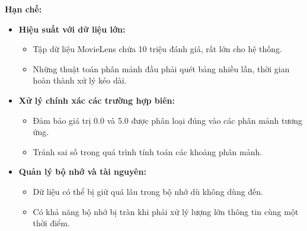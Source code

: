 \documentclass[14pt]{extarticle}
\begin{document}
\textbf{Hạn chế:}
\begin{itemize}
    \item \textbf{Hiệu suất với dữ liệu lớn:}
    \begin{itemize}
        \item Tập dữ liệu MovieLens chứa 10 triệu đánh giá, rất lớn cho hệ thống.
        \item Những thuật toán phân mảnh đầu phải quét bảng nhiều lần, thời gian hoàn thành xử lý kéo dài.
    \end{itemize}
    \item \textbf{Xử lý chính xác các trường hợp biên:}
    \begin{itemize}
        \item Đảm bảo giá trị 0.0 và 5.0 được phân loại đúng vào các phân mảnh tương ứng.
        \item Tránh sai số trong quá trình tính toán các khoảng phân mảnh.
    \end{itemize}
    \item \textbf{Quản lý bộ nhớ và tài nguyên:}
    \begin{itemize}
        \item Dữ liệu có thể bị giữ quá lâu trong bộ nhớ dù không dùng đến.
        \item Có khả năng bộ nhớ bị tràn khi phải xử lý lượng lớn thông tin cùng một thời điểm.
    \end{itemize}
\end{itemize}
\end{document}
